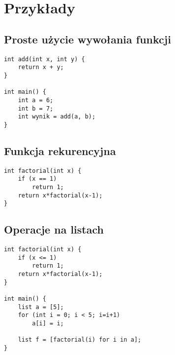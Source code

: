 \documentclass{article}
\begin{document}
\newpage
\section{Przykłady}
\subsection{Proste użycie wywołania funkcji}
\begin{lstlisting}[tabsize=2]
int add(int x, int y) {
	return x + y;
}

int main() {
	int a = 6;
	int b = 7;
	int wynik = add(a, b);
}
\end{lstlisting}

\subsection{Funkcja rekurencyjna}
\begin{lstlisting}[tabsize=2]
int factorial(int x) {
	if (x == 1)
		return 1;
	return x*factorial(x-1);
}
\end{lstlisting}

\subsection{Operacje na listach}
\begin{lstlisting}[tabsize=2]
int factorial(int x) {
	if (x <= 1)
		return 1;
	return x*factorial(x-1);
}

int main() {
	list a = [5];
	for (int i = 0; i < 5; i=i+1)
		a[i] = i;

	list f = [factorial(i) for i in a];
}

\end{lstlisting}
\end{document}
